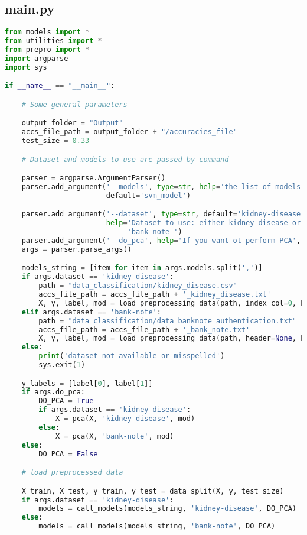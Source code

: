 \documentclass[11pt,a4paper]{article}
\begin{document}
\subsection{main.py}
\begin{lstlisting}[language=Python,basicstyle=\tiny]
from models import *
from utilities import *
from prepro import *
import argparse
import sys

if __name__ == "__main__":

    # Some general parameters

    output_folder = "Output"
    accs_file_path = output_folder + "/accuracies_file"
    test_size = 0.33

    # Dataset and models to use are passed by command

    parser = argparse.ArgumentParser()
    parser.add_argument('--models', type=str, help='the list of models you want to use',
                        default='svm_model')

    parser.add_argument('--dataset', type=str, default='kidney-disease',
                        help='Dataset to use: either kidney-disease or '
                             'bank-note ')
    parser.add_argument('--do_pca', help='If you want ot perform PCA', action='store_true')
    args = parser.parse_args()

    models_string = [item for item in args.models.split(',')]
    if args.dataset == 'kidney-disease':
        path = "data_classification/kidney_disease.csv"
        accs_file_path = accs_file_path + '_kidney_disease.txt'
        X, y, label, mod = load_preprocessing_data(path, index_col=0, binar=True)  # for kidney_disease
    elif args.dataset == 'bank-note':
        path = "data_classification/data_banknote_authentication.txt"
        accs_file_path = accs_file_path + '_bank_note.txt'
        X, y, label, mod = load_preprocessing_data(path, header=None, binar=True)  # for banknote
    else:
        print('dataset not available or misspelled')
        sys.exit(1)

    y_labels = [label[0], label[1]]
    if args.do_pca:
        DO_PCA = True
        if args.dataset == 'kidney-disease':
            X = pca(X, 'kidney-disease', mod)
        else:
            X = pca(X, 'bank-note', mod)
    else:
        DO_PCA = False

    # load preprocessed data

    X_train, X_test, y_train, y_test = data_split(X, y, test_size)
    if args.dataset == 'kidney-disease':
        models = call_models(models_string, 'kidney-disease', DO_PCA)
    else:
        models = call_models(models_string, 'bank-note', DO_PCA)


\end{lstlisting}
\end{document}
